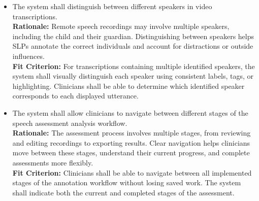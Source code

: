 \documentclass[12pt]{article}
\newcounter{reqnum} %
\newcommand{\rthereqnum}{FR\thereqnum}
\begin{document}
\begin{itemize}
\item[\textbf{\rthereqnum} \label{FR_SpeakerIdentification}:] The system shall distinguish between different speakers in video transcriptions.
\\ \textbf{Rationale:} Remote speech recordings may involve multiple speakers, including the child and their guardian. Distinguishing between speakers helps SLPs annotate the correct individuals and account for distractions or outside influences.
\\ \textbf{Fit Criterion:} For transcriptions containing multiple identified speakers, the system shall visually distinguish each speaker using consistent labels, tags, or highlighting. Clinicians shall be able to determine which identified speaker corresponds to each displayed utterance.

\item[\textbf{\rthereqnum} \label{FR_AssessmentWorkflowNavigation}:] The system shall allow clinicians to navigate between different stages of the speech assessment analysis workflow.
\\ \textbf{Rationale:} The assessment process involves multiple stages, from reviewing and editing recordings to exporting results. Clear navigation helps clinicians move between these stages, understand their current progress, and complete assessments more flexibly.
\\ \textbf{Fit Criterion:} Clinicians shall be able to navigate between all implemented stages of the annotation workflow without losing saved work. The system shall indicate both the current and completed stages of the assessment.


\end{itemize}
\end{document}
